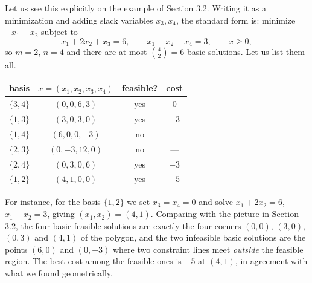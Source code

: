 \documentclass[a4paper]{scrartcl}
\begin{document}
\begin{example}
    Let us see this explicitly on the example of Section 3.2. Writing it as a minimization and adding slack variables $x_3, x_4$, the standard form is: minimize $-x_1 - x_2$ subject to
    $$
    x_1 + 2x_2 + x_3 = 6, \qquad x_1 - x_2 + x_4 = 3, \qquad x \geq 0,
    $$
    so $m = 2$, $n = 4$ and there are at most $\binom42 = 6$ basic solutions. Let us list them all.
    \begin{center}
    \begin{tabular}{c|c|c|c}
        basis & $x = (x_1,x_2,x_3,x_4)$ & feasible? & cost \\\hline
        $\{3,4\}$ & $(0,0,6,3)$ & yes & $0$ \\
        $\{1,3\}$ & $(3,0,3,0)$ & yes & $-3$ \\
        $\{1,4\}$ & $(6,0,0,-3)$ & no & --- \\
        $\{2,3\}$ & $(0,-3,12,0)$ & no & --- \\
        $\{2,4\}$ & $(0,3,0,6)$ & yes & $-3$ \\
        $\{1,2\}$ & $(4,1,0,0)$ & yes & $-5$
    \end{tabular}
    \end{center}
    For instance, for the basis $\{1,2\}$ we set $x_3 = x_4 = 0$ and solve $x_1 + 2x_2 = 6$, $x_1 - x_2 = 3$, giving $(x_1, x_2) = (4,1)$. Comparing with the picture in Section 3.2, the four basic feasible solutions are exactly the four corners $(0,0)$, $(3,0)$, $(0,3)$ and $(4,1)$ of the polygon, and the two infeasible basic solutions are the points $(6,0)$ and $(0,-3)$ where two constraint lines meet \emph{outside} the feasible region. The best cost among the feasible ones is $-5$ at $(4,1)$, in agreement with what we found geometrically.
\end{example}
\end{document}
